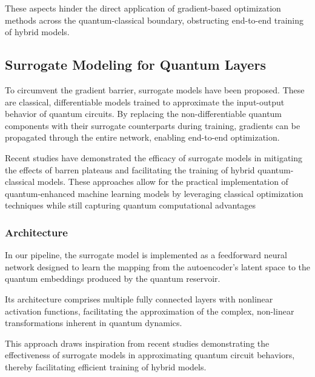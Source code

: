\documentclass[conference]{IEEEtran}
\begin{document}
These aspects hinder the direct application of 
gradient-based optimization methods across the 
quantum-classical boundary, obstructing end-to-end 
training of hybrid models.

\subsection{Surrogate Modeling for Quantum Layers}
To circumvent the gradient barrier, surrogate models 
have been proposed. These are classical, differentiable 
models trained to approximate the input-output behavior 
of quantum circuits. By replacing the non-differentiable 
quantum components with their surrogate counterparts during 
training, gradients can be propagated through the entire network, 
enabling end-to-end optimization. 

Recent studies have demonstrated the efficacy of 
surrogate models in mitigating the effects of barren plateaus 
and facilitating the training of hybrid quantum-classical models. 
These approaches allow for the practical implementation of 
quantum-enhanced machine learning models by leveraging classical 
optimization techniques while still capturing quantum computational 
advantages~\cite{xieQuantumSurrogateDrivenImage2025b}


\subsubsection{Architecture}
In our pipeline, the surrogate model is implemented as a 
feedforward neural network designed to learn the mapping 
from the autoencoder's latent space to the quantum 
embeddings produced by the quantum reservoir. 

Its architecture comprises multiple fully connected 
layers with nonlinear activation functions, facilitating 
the approximation of the complex, non-linear 
transformations inherent in quantum dynamics.

This approach draws inspiration from recent studies 
demonstrating the effectiveness of surrogate models 
in approximating quantum circuit behaviors, thereby 
facilitating efficient training of hybrid 
models.~\cite{xieQuantumSurrogateDrivenImage2025b,schreiberClassicalSurrogatesQuantum2023}
\end{document}

